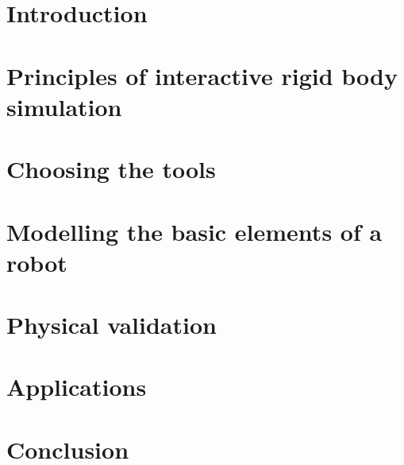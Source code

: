 \documentclass[12pt,a4paper]{report}
\begin{document}


\tableofcontents

\listoffigures

\listoftables

\clearpage
\setcounter{page}{1}
\chapter{Introduction}


\chapter{Principles of interactive rigid body simulation}
\label{chap:principles}


\chapter{Choosing the tools}
\label{chap:choice}


\chapter{Modelling the basic elements of a robot}
\label{chap:modelling}


\chapter{Physical validation}
\label{chap:physical_val}


\chapter{Applications}
\label{chap:simulation}


\chapter{Conclusion}
\label{chap:conclusion}





\appendix

\end{document}
